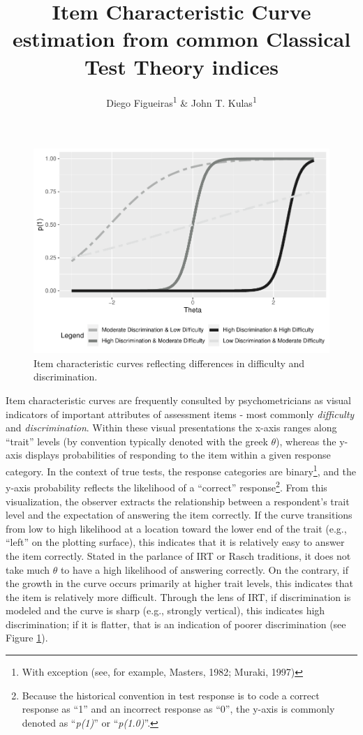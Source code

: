 \documentclass[
  man]{apa6}
\title{Item Characteristic Curve estimation from common Classical Test Theory indices}
\author{Diego Figueiras\textsuperscript{1} \& John T. Kulas\textsuperscript{1}}
\date{}
\affiliation{\vspace{0.5cm}\textsuperscript{1} Montclair State University}
\begin{document}
\maketitle

\begin{figure}
\includegraphics[width=1\linewidth,height=0.8\textheight]{ICC_project_files/figure-latex/example-1} \caption{Item characteristic curves reflecting differences in difficulty and discrimination.}\label{fig:example}
\end{figure}

Item characteristic curves are frequently consulted by psychometricians as visual indicators of important attributes of assessment items - most commonly \emph{difficulty} and \emph{discrimination}. Within these visual presentations the x-axis ranges along ``trait'' levels (by convention typically denoted with the greek \(\theta\)), whereas the y-axis displays probabilities of responding to the item within a given response category. In the context of true tests, the response categories are binary\footnote{With exception (see, for example, Masters, 1982; Muraki, 1997)}, and the y-axis probability reflects the likelihood of a ``correct'' response\footnote{Because the historical convention in test response is to code a correct response as ``1'' and an incorrect response as ``0'', the y-axis is commonly denoted as ``\emph{p(1)}'' or ``\emph{p(1.0)}''.}. From this visualization, the observer extracts the relationship between a respondent's trait level and the expectation of answering the item correctly. If the curve transitions from low to high likelihood at a location toward the lower end of the trait (e.g., ``left'' on the plotting surface), this indicates that it is relatively easy to answer the item correctly. Stated in the parlance of IRT or Rasch traditions, it does not take much \(\theta\) to have a high likelihood of answering correctly. On the contrary, if the growth in the curve occurs primarily at higher trait levels, this indicates that the item is relatively more difficult. Through the lens of IRT, if discrimination is modeled and the curve is sharp (e.g., strongly vertical), this indicates high discrimination; if it is flatter, that is an indication of poorer discrimination (see Figure \ref{fig:example}).
\end{document}
